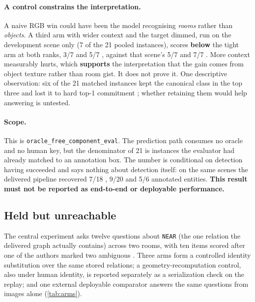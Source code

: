 \paragraph{A control constrains the interpretation.}
A naive RGB win could have been the model
recognising \emph{rooms} rather than \emph{objects}. A third arm with wider context and
the target dimmed, run on the development scene only (7 of the 21 pooled instances),
scores \textbf{below} the tight arm at both ranks, 3/7  and 5/7 ,
against that scene's 5/7  and 7/7 . More context measurably hurts,
which \textbf{supports} the interpretation that the gain comes from object texture rather
than room gist. It does not prove it. One descriptive observation: six of the 21 matched
instances kept the canonical class in the top three and lost it to hard top-1 commitment
; whether retaining them would help answering is untested.

\paragraph{Scope.}
This is \texttt{oracle\_free\_component\_eval}. The prediction path consumes no oracle
and no human key, but the denominator of 21 is instances the evaluator had already
matched to an annotation box. The number is conditional on detection having succeeded and
says nothing about detection itself: on the same scenes the delivered pipeline recovered
7/18 , 9/20  and 5/6  annotated entities. \textbf{This result
must not be reported as end-to-end or deployable performance.}

\subsection{Held but unreachable}
\label{sec:unreachable}

The central experiment asks twelve questions about \texttt{NEAR} (the one relation the
delivered graph actually contains) across two rooms, with ten items scored after one
of the authors marked two ambiguous . Three arms form a controlled identity
substitution over the same stored relations; a geometry-recomputation control, also
under human identity, is reported separately as a serialization check on the replay;
and one external deployable comparator answers the same questions from images alone
(\cref{tab:arms}).

